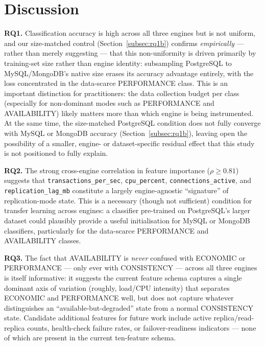 \documentclass[pdflatex,sn-mathphys-num]{sn-jnl}
\theoremstyle{thmstyleone}
\theoremstyle{thmstylethree}
\begin{document}
\section{Discussion}\label{sec:discussion}

\textbf{RQ1.} Classification accuracy is high across all three engines
but is not uniform, and our size-matched control
(Section~\ref{subsec:rq1b}) confirms \emph{empirically} --- rather
than merely suggesting --- that this non-uniformity is driven
primarily by training-set size rather than engine identity: subsampling
PostgreSQL to MySQL/MongoDB's native size erases its accuracy
advantage entirely, with the loss concentrated in the data-scarce
PERFORMANCE class. This is an important distinction for practitioners:
the data collection budget per class (especially for non-dominant
modes such as PERFORMANCE and AVAILABILITY) likely matters more than
which engine is being instrumented. At the same time, the size-matched
PostgreSQL condition does not fully converge with MySQL or MongoDB
accuracy (Section~\ref{subsec:rq1b}), leaving open the
possibility of a smaller, engine- or dataset-specific residual effect
that this study is not positioned to fully explain.

\textbf{RQ2.} The strong cross-engine correlation in feature importance
($\rho \geq 0.81$) suggests that \texttt{transactions\_per\_sec},
\texttt{cpu\_percent}, \texttt{connections\_active}, and
\texttt{replication\_lag\_mb} constitute a largely engine-agnostic
``signature'' of replication-mode state. This is a necessary (though
not sufficient) condition for transfer learning across engines: a
classifier pre-trained on PostgreSQL's larger dataset could plausibly
provide a useful initialisation for MySQL or MongoDB classifiers,
particularly for the data-scarce PERFORMANCE and AVAILABILITY classes.

\textbf{RQ3.} The fact that AVAILABILITY is \emph{never} confused with
ECONOMIC or PERFORMANCE --- only ever with CONSISTENCY --- across all
three engines is itself informative: it suggests the current feature
schema captures a single dominant axis of variation (roughly,
load/CPU intensity) that separates ECONOMIC and PERFORMANCE well, but
does not capture whatever distinguishes an ``available-but-degraded''
state from a normal CONSISTENCY state. Candidate additional features
for future work include active replica/read-replica counts, health-check
failure rates, or failover-readiness indicators --- none of which are
present in the current ten-feature schema.
\end{document}
